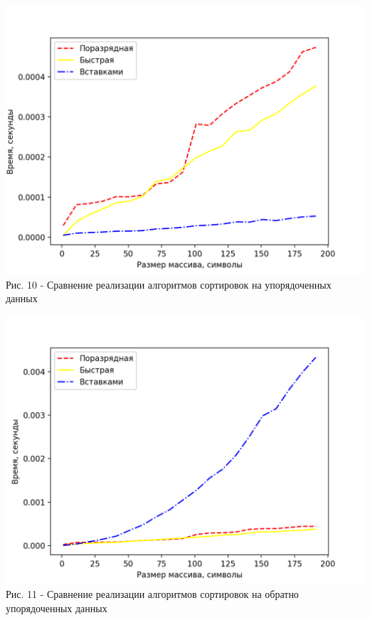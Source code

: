 \documentclass[a4paper,14pt]{article} %
\begin{document}
	\begin{center}
        		\includegraphics[scale = 1]{graph5} \\ Рис. 10 - Сравнение реализации алгоритмов сортировок на упорядоченных данных
	\end{center}
	
	\begin{center}
        		\includegraphics[scale = 1]{graph6} \\ Рис. 11 - Сравнение реализации алгоритмов сортировок на обратно упорядоченных данных
	\end{center}
	
\end{document}
